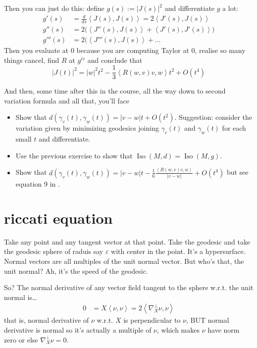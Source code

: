 Then you can just do this: define \(g(s):=|J(s)|^2\) and differentiate \(g\) a lot:
\begin{align*}
g'(s)&=\frac{d}{ds}\left<J(s),J(s)\right>=2 \left<J'(s),J(s)\right>\\
g''(s)&=2\Big(\left<J''(s),J(s)\right>+\left<J'(s),J'(s)\right>\Big)\\
g'''(s)&=2 \Big(\left< J'''(s),J(s)\right>+\ldots
\end{align*}
Then you evaluate at \(0\) because you are computing Taylor at 0, realise so many things cancel, find \(R\) at \(g^{iv}\) and conclude that
\[|J(t)|^2=|w|^2t^2-\frac{1}{3}\left<R(w,v)v,w\right>t^2+O(t^4)\]

And then, some time after this in the course, all the way down to second variation formula and all that, you'll face
\begin{exercise}\leavevmode
\begin{itemize}
\item Show that \(d(\gamma_v(t),\gamma_w(t))=|v-w|t+O(t^2)\). Suggestion: consider the variation given by minimizing geodesics joining \(\gamma_c(t)\) and \(\gamma_w(t)\) for each small \(t\) and differentiate.
\item Use the previous exercise to show that \(\operatorname{Iso}(M,d)=\operatorname{Iso}(M,g)\).
\item Show that \(d(\gamma_v(t),\gamma_w(t))=|v-w|t-\frac{1}{6}\frac{\left<R(w,v)v,w\right>}{|v-w|}+O(t^4)\) but see equation 9 in \cite{mey}.
\end{itemize}
\end{exercise}


\section{riccati equation}

Take any point and any tangent vector at that point. Take the geodesic and take the geodesic sphere of raduis say \(\varepsilon\) with center in the point. It's a hypersurface. Normal vectors are all multiples of the unit normal vector. But who's that, the unit normal? Ah, it's the speed of the geodesic.



So? The normal derivative of any vector field tangent to the sphere w.r.t. the unit normal is…
\begin{align*}
0&=X\left<\nu,\nu\right>=2\left<\nabla^\perp_X \nu,\nu\right>
\end{align*}
that is, normal derivative of \(\nu\) w.r.t. \(X\) is perpendicular to \(\nu\), BUT normal derivative is normal so it's actually a multiple of \(\nu\), which makes \(\nu\) have norm zero or else \(\nabla^\perp_X \nu=0\).

